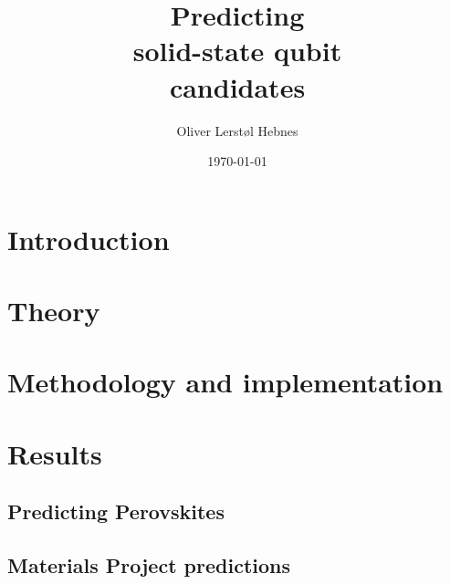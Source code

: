 \documentclass[twoside, english, notitlepage, 12pt]{uiofysmaster}
\author{Oliver Lerstøl Hebnes}
\title{Predicting\\
solid-state qubit\\
candidates
}
\date{\today}
\begin{document}
\hypersetup{pageanchor=false}
\frontmatter
    \maketitle

    \begin{abstract}
    
    \end{abstract}

    \begin{acknowledgements}
    
    \end{acknowledgements}

    \setcounter{tocdepth}{1}
    \tableofcontents

\mainmatter
    \part{Introduction}
      

    \part{Theory}
        
        
        

    \part{Methodology and implementation}
        

    \part{Results}
      \chapter{Predicting Perovskites}
      \chapter{Materials Project predictions}
\end{document}
